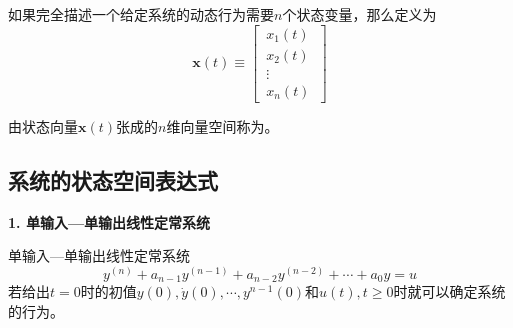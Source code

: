 如果完全描述一个给定系统的动态行为需要$n$个状态变量，那么定义为
\begin{equation}
	\bm{x}(t) \equiv 
	\begin{bmatrix}
		\, x_1(t)\, \\
		\, x_2(t)\, \\
		\, \vdots\, \\
		\, x_n(t)\,
	\end{bmatrix}
\end{equation}

由状态向量$\bm{x}(t)$张成的$n$维向量空间称为。
\vspace*{1em}

\subsection{系统的状态空间表达式}
\noindent \textbf{1. 单输入—单输出线性定常系统}

单输入—单输出线性定常系统
\begin{equation}
	y^{(n)}+a_{n-1}y^{(n-1)} + a_{n-2}y^{(n-2)} + \cdots +a_0 y = u
	\label{单输入输出}
\end{equation}
若给出$t=0$时的初值$y(0), \dot{y}(0), \cdots , y^{n-1}(0)$和$u(t),t \ge 0$时就可以确定系统的行为。

